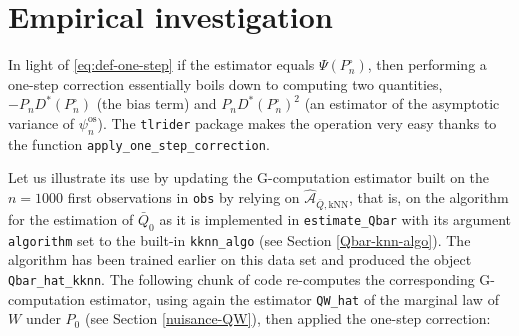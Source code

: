 \documentclass[
  11pt,
  openright,twoside]{book}
\newenvironment{Shaded}{\begin{snugshade}}{\end{snugshade}}
\newcommand{\CommentTok}[1]{\textcolor[rgb]{0.56,0.35,0.01}{\textit{#1}}}
\newcommand{\ConstantTok}[1]{\textcolor[rgb]{0.00,0.00,0.00}{#1}}
\newcommand{\FloatTok}[1]{\textcolor[rgb]{0.00,0.00,0.81}{#1}}
\newcommand{\FunctionTok}[1]{\textcolor[rgb]{0.00,0.00,0.00}{#1}}
\newcommand{\NormalTok}[1]{#1}
\newcommand{\OtherTok}[1]{\textcolor[rgb]{0.56,0.35,0.01}{#1}}
\newcommand{\SpecialCharTok}[1]{\textcolor[rgb]{0.00,0.00,0.00}{#1}}
\newcommand{\Algo}{\widehat{\mathcal{A}}}
\newcommand{\psinos}{\psi_{n}^{\textrm{os}}}
\newcommand{\Phat}{P^{\circ}}
\newcommand{\Qbar}{\bar{Q}}
\theoremstyle{definition}
\theoremstyle{definition}
\theoremstyle{definition}
\theoremstyle{definition}
\theoremstyle{remark}
\begin{document}
\hypertarget{empirical-inves-one-step}{%
\section{Empirical investigation}\label{empirical-inves-one-step}}

In light of \eqref{eq:def-one-step} if the estimator equals \(\Psi(\Phat_{n})\),
then performing a one-step correction essentially boils down to computing two
quantities, \(-P_{n} D^{*}(\Phat_{n})\) (the bias term) and \(P_{n} D^{*}(\Phat_{n})^{2}\) (an estimator of the asymptotic variance of
\(\psinos\)). The \texttt{tlrider} package makes the operation very easy thanks to the
function \texttt{apply\_one\_step\_correction}.

Let us illustrate its use by updating the G-computation estimator built on the
\(n=1000\) first observations in \texttt{obs} by relying on \(\Algo_{\Qbar,\text{kNN}}\),
that is, on the algorithm for the estimation of \(\Qbar_{0}\) as it is
implemented in \texttt{estimate\_Qbar} with its argument \texttt{algorithm} set to the
built-in \texttt{kknn\_algo} (see Section \ref{Qbar-knn-algo}). The algorithm has
been trained earlier on this data set and produced the object \texttt{Qbar\_hat\_kknn}.
The following chunk of code re-computes the corresponding G-computation
estimator, using again the estimator \texttt{QW\_hat} of the marginal law of \(W\) under
\(P_{0}\) (see Section \ref{nuisance-QW}), then applied the one-step correction:

\begin{Shaded}
\end{Shaded}
\end{document}
